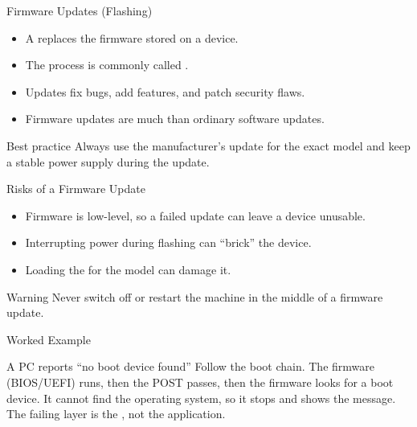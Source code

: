 \documentclass[aspectratio=169]{beamer}
\begin{document}
\begin{frame}{Firmware Updates (Flashing)}
  \begin{itemize}
    \item A  replaces the firmware stored on a device.
    \item The process is commonly called .
    \item Updates fix bugs, add features, and patch security flaws.
    \item Firmware updates are much  than ordinary software
      updates.
  \end{itemize}
  \begin{block}{Best practice}
    Always use the manufacturer's update for the exact model and keep a
    stable power supply during the update.
  \end{block}
\end{frame}

\begin{frame}{Risks of a Firmware Update}
  \begin{itemize}
    \item Firmware is low-level, so a failed update can leave a device
      unusable.
    \item Interrupting power during flashing can ``brick'' the device.
    \item Loading the  for the model can damage it.
  \end{itemize}
  \begin{alertblock}{Warning}
    Never switch off or restart the machine in the middle of a firmware
    update.
  \end{alertblock}
\end{frame}

\begin{frame}{Worked Example}
  \begin{exampleblock}{A PC reports ``no boot device found''}
    Follow the boot chain. The firmware (BIOS/UEFI) runs, then the POST
    passes, then the firmware looks for a boot device. It cannot find the
    operating system, so it stops and shows the message. The failing layer is
    the , not the application.
  \end{exampleblock}
  \vspace{0.2cm}
\end{frame}
\end{document}
